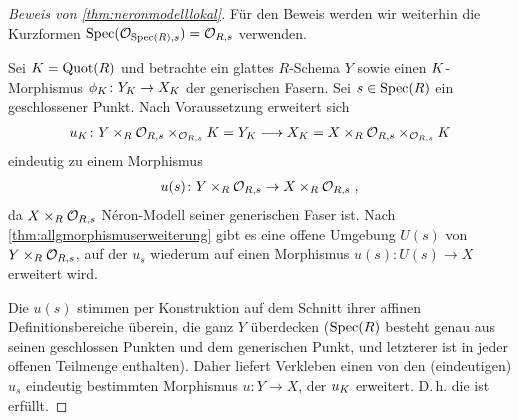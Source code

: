 \documentclass[german]{scrreprt}
\begin{document}
\begin{proof}[Beweis von \autoref{thm:neronmodelllokal}]
  Für den Beweis werden wir weiterhin die Kurzformen
  $\operatorname{Spec}(\mathcal{O}_{\operatorname{Spec}(R),s})=\mathcal{O}_{R,s}$ verwenden.
    
    Sei $K=\operatorname{Quot}(R)$ und betrachte ein glattes $R$-Schema $Y$ sowie
    einen $K$-Morphismus $\phi_{K}\colon Y_{K}\to X_{K}$ der
    generischen Fasern.
    Sei $s\in\operatorname{Spec}(R)$ ein geschlossener Punkt.
    Nach Voraussetzung erweitert sich
    \begin{gather*}
      u_{K}\colon
      Y\times_R\mathcal{O}_{R,s}\times_{\mathcal{O}_{R,s}}K = Y_{K}
      \longrightarrow
      X_{K} = X\times_R\mathcal{O}_{R,s}\times_{\mathcal{O}_{R,s}}K
    \end{gather*}
    eindeutig zu einem Morphismus
    \begin{gather*}
      u(s)\colon Y\times_R\mathcal{O}_{R,s}\to X\times_R\mathcal{O}_{R,s}\;,
    \end{gather*}
    da $X\times_R\mathcal{O}_{R,s}$ Néron-Modell seiner generischen Faser ist.
    Nach \autoref{thm:allgmorphismuserweiterung} gibt es eine offene
    Umgebung $U(s)$ von $Y\times_R\mathcal{O}_{R,s}$, auf der $u_s$ wiederum
    auf einen Morphismus $u(s)\colon U(s)\to X$ erweitert wird.
    
    Die $u(s)$ stimmen per Konstruktion auf dem Schnitt ihrer
    affinen Definitionsbereiche überein,
    die ganz $Y$ überdecken ($\operatorname{Spec}(R)$ besteht genau aus seinen
    geschlossen Punkten und dem generischen Punkt, und letzterer ist
    in jeder offenen Teilmenge enthalten).
    Daher liefert Verkleben einen von den (eindeutigen) $u_s$ eindeutig
    bestimmten Morphismus $u\colon Y\to X$, der $u_{K}$ erweitert.
    D.\,h. die \NAbbEig ist erfüllt.
  \end{proof}
\end{document}
